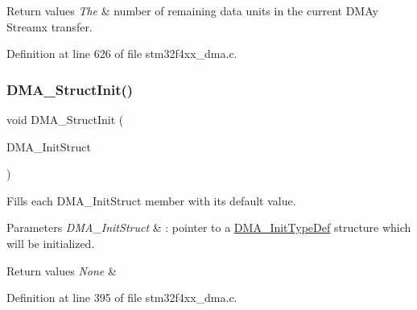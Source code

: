 \begin{DoxyRetVals}{Return values}
{\em The} & number of remaining data units in the current D\+M\+Ay Streamx transfer. \\
\hline
\end{DoxyRetVals}


Definition at line 626 of file stm32f4xx\+\_\+dma.\+c.

\mbox{\label{group___d_m_a_ga0f7f95f750a90a6824f4e9b6f58adc7e}} 
\subsubsection{\texorpdfstring{D\+M\+A\+\_\+\+Struct\+Init()}{DMA\_StructInit()}}
{\footnotesize\ttfamily void D\+M\+A\+\_\+\+Struct\+Init (\begin{DoxyParamCaption}\item[{\hyperlink{struct_d_m_a___init_type_def}{D\+M\+A\+\_\+\+Init\+Type\+Def} $\ast$}]{D\+M\+A\+\_\+\+Init\+Struct }\end{DoxyParamCaption})}



Fills each D\+M\+A\+\_\+\+Init\+Struct member with its default value. 


\begin{DoxyParams}{Parameters}
{\em D\+M\+A\+\_\+\+Init\+Struct} & \+: pointer to a \hyperlink{struct_d_m_a___init_type_def}{D\+M\+A\+\_\+\+Init\+Type\+Def} structure which will be initialized. \\
\hline
\end{DoxyParams}

\begin{DoxyRetVals}{Return values}
{\em None} & \\
\hline
\end{DoxyRetVals}


Definition at line 395 of file stm32f4xx\+\_\+dma.\+c.

